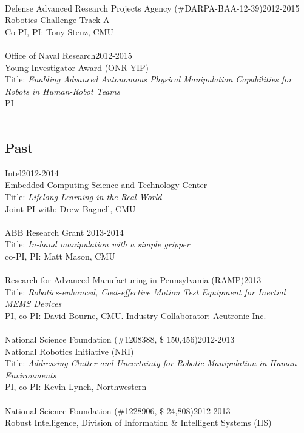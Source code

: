 \documentclass[10pt]{article}
\begin{document}
\\
Defense Advanced Research Projects Agency (\#DARPA-BAA-12-39)\hfill 2012-2015\\
Robotics Challenge Track A\\
Co-PI, PI: Tony Stenz, CMU\\
\\
Office of Naval Research\hfill 2012-2015\\
Young Investigator Award (ONR-YIP)\\
Title: \textit{Enabling Advanced Autonomous Physical Manipulation Capabilities for Robots in Human-Robot Teams}\\
PI\\
\\

\subsection{Past}
\noindent
Intel\hfill 2012-2014\\
Embedded Computing Science and Technology Center\\
Title: \textit{Lifelong Learning in the Real World}\\
Joint PI with: Drew Bagnell, CMU\\
\\
ABB Research Grant \hfill 2013-2014\\
Title: \textit{In-hand manipulation with a simple gripper}\\
co-PI, PI: Matt Mason, CMU\\
\\
Research for Advanced Manufacturing in Pennsylvania (RAMP)\hfill 2013\\
Title: \textit{Robotics-enhanced, Cost-effective Motion Test Equipment for Inertial MEMS Devices}\\
PI, co-PI: David Bourne, CMU. Industry Collaborator: Acutronic Inc.\\
\\
National Science Foundation (\#1208388, \$ 150,456)\hfill 2012-2013\\
National Robotics Initiative (NRI)\\
Title: \textit{Addressing Clutter and Uncertainty for Robotic Manipulation in Human Environments}\\
PI, co-PI: Kevin Lynch, Northwestern\\
\\
National Science Foundation (\#1228906, \$ 24,808)\hfill 2012-2013\\
Robust Intelligence, Division of Information \& Intelligent Systems (IIS)\\
\end{document}
